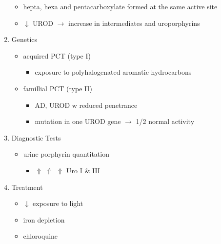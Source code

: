 \documentclass[12pt]{scrartcl}
\begin{document}
\begin{enumerate}
\begin{itemize}
\item hepta, hexa and pentacarboxylate formed at the same active site
\item \(\downarrow\) UROD \(\to\) increase in intermediates and uroporphyrins
\end{itemize}
\item Genetics
\label{sec:orge66ab74}
\begin{itemize}
\item acquired PCT (type I)
\begin{itemize}
\item exposure to polyhalogenated aromatic hydrocarbons
\end{itemize}
\item famillial PCT (type II)
\begin{itemize}
\item AD, UROD w reduced penetrance
\item mutation in one UROD gene \(\to\) 1/2 normal activity
\end{itemize}
\end{itemize}
\item Diagnostic Tests
\label{sec:orgc0cee23}
\begin{itemize}
\item urine porphyrin quantitation
\begin{itemize}
\item \(\Uparrow\) \(\Uparrow\) \(\Uparrow\) Uro I \& III
\end{itemize}
\end{itemize}
\item Treatment
\label{sec:org91f0bed}
\begin{itemize}
\item \(\downarrow\) exposure to light
\item iron depletion
\item chloroquine
\end{itemize}
\end{enumerate}
\end{document}
